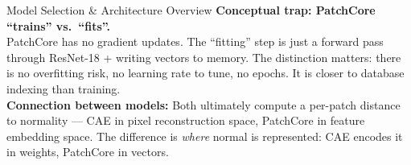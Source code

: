 \documentclass[aspectratio=169,10pt]{beamer}
\begin{document}
\begin{frame}{Model Selection \& Architecture Overview}
{  \textbf{Conceptual trap: PatchCore ``trains'' vs.~``fits''.}\\[0.5pt]
  PatchCore has no gradient updates. The ``fitting'' step is just a forward pass through
  ResNet-18 + writing vectors to memory. The distinction matters: there is no overfitting risk,
  no learning rate to tune, no epochs. It is closer to database indexing than training.\\[1.5pt]

  \textbf{Connection between models:} Both ultimately compute a per-patch distance to normality
  — CAE in pixel reconstruction space, PatchCore in feature embedding space.
  The difference is \emph{where} normal is represented: CAE encodes it in weights, PatchCore in vectors.
}
\end{frame}

\end{document}
